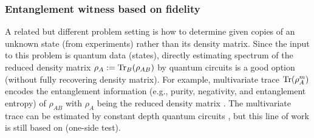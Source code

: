\documentclass[
aps,
pra,
twocolumn,
floatfix,
]{revtex4-2}
\theoremstyle{plain}
\theoremstyle{definition}
\newcommand{\dm}{\rho}
\newcommand{\U}{U}
\begin{document}
\subsubsection{Entanglement witness based on fidelity}\label{sec:entanglement_witness}
A related but different problem setting is how to determine  given copies of an unknown state (from experiments) rather than its density matrix.
Since the input to this problem is quantum data (states), directly estimating spectrum of the reduced density matrix $\rho_A:=\Tr_B(\rho_{AB})$ by quantum circuits is a good option (without fully recovering density matrix).
For example, multivariate trace $\Tr(\dm_A^m)$ encodes the entanglement information (e.g., purity, negativity, and entanglement entropy) of $\dm_{AB}$ with $\dm_A$ being the  reduced density matrix
 \cite{ekertDirectEstimationsLinear2002} \cite{horodeckiDirectDetectionQuantum2002}
\cite{wang16qubitIBMUniversal2018}
.
The multivariate trace can be estimated by constant depth quantum circuits \cite{johriEntanglementSpectroscopyQuantum2017}  \cite{quekMultivariateTraceEstimation2022}, 
but this line of work is still based on  (one-side test).
\end{document}
